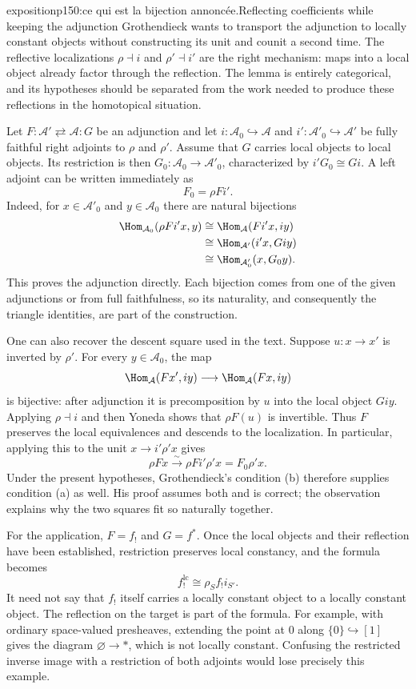 \begin{dcomment}{exposition}{p150:ce qui est la bijection annoncée.}{Reflecting coefficients while keeping the adjunction}
Grothendieck wants to transport the adjunction to locally constant objects without constructing its unit and counit a second time. The reflective localizations $\rho\dashv i$ and $\rho'\dashv i'$ are the right mechanism: maps into a local object already factor through the reflection. The lemma is entirely categorical, and its hypotheses should be separated from the work needed to produce these reflections in the homotopical situation.

Let $F:\mathcal A'\rightleftarrows\mathcal A:G$ be an adjunction and let $i:\mathcal A_0\hookrightarrow\mathcal A$ and $i':\mathcal A'_0\hookrightarrow\mathcal A'$ be fully faithful right adjoints to $\rho$ and $\rho'$. Assume that $G$ carries local objects to local objects. Its restriction is then $G_0:\mathcal A_0\to\mathcal A'_0$, characterized by $i'G_0\cong Gi$. A left adjoint can be written immediately as
\[
 F_0=\rho Fi'.
\]
Indeed, for $x\in\mathcal A'_0$ and $y\in\mathcal A_0$ there are natural bijections
\[
\begin{aligned}
 \Hom_{\mathcal A_0}(\rho Fi'x,y)
 &\cong\Hom_{\mathcal A}(Fi'x,iy)\\
 &\cong\Hom_{\mathcal A'}(i'x,Giy)\\
 &\cong\Hom_{\mathcal A'_0}(x,G_0y).
\end{aligned}
\]
This proves the adjunction directly. Each bijection comes from one of the given adjunctions or from full faithfulness, so its naturality, and consequently the triangle identities, are part of the construction.

One can also recover the descent square used in the text. Suppose $u:x\to x'$ is inverted by $\rho'$. For every $y\in\mathcal A_0$, the map
\[
 \Hom_{\mathcal A}(Fx',iy)\longrightarrow\Hom_{\mathcal A}(Fx,iy)
\]
is bijective: after adjunction it is precomposition by $u$ into the local object $Giy$. Applying $\rho\dashv i$ and then Yoneda shows that $\rho F(u)$ is invertible. Thus $F$ preserves the local equivalences and descends to the localization. In particular, applying this to the unit $x\to i'\rho'x$ gives
\[
 \rho Fx\xrightarrow{\sim}\rho Fi'\rho'x=F_0\rho'x.
\]
Under the present hypotheses, Grothendieck's condition (b) therefore supplies condition (a) as well. His proof assumes both and is correct; the observation explains why the two squares fit so naturally together.

For the application, $F=f_!$ and $G=f^*$. Once the local objects and their reflection have been established, restriction preserves local constancy, and the formula becomes
\[
 f_!^{\mathrm{lc}}\cong\rho_S f_!i_{S'}.
\]
It need not say that $f_!$ itself carries a locally constant object to a locally constant object. The reflection on the target is part of the formula. For example, with ordinary space-valued presheaves, extending the point at $0$ along $\{0\}\hookrightarrow[1]$ gives the diagram $\varnothing\to *$, which is not locally constant. Confusing the restricted inverse image with a restriction of both adjoints would lose precisely this example.


\end{dcomment}
